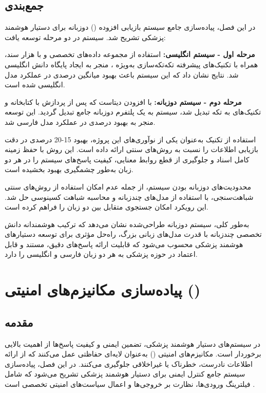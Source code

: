 \documentclass[11pt, a4paper, oneside]{book}
\begin{document}
	\section{جمع‌بندی}

	در این فصل، پیاده‌سازی جامع سیستم بازیابی افزوده () دوزبانه برای دستیار هوشمند پزشکی تشریح شد. سیستم در دو مرحله توسعه یافت:

	\textbf{مرحله اول - سیستم انگلیسی:}
	استفاده از مجموعه داده‌های تخصصی  و  با  هزار سند، همراه با تکنیک‌های پیشرفته تکه‌تکه‌سازی به‌ویژه ، منجر به ایجاد پایگاه دانش انگلیسی شد. نتایج نشان داد که این سیستم باعث بهبود میانگین  درصدی در عملکرد مدل انگلیسی شده است.

	\textbf{مرحله دوم - سیستم دوزبانه:}
	با افزودن دیتاست  که پس از پردازش با کتابخانه  و تکنیک‌های  به  تکه تبدیل شد، سیستم به یک پلتفرم دوزبانه جامع تبدیل گردید. این توسعه منجر به بهبود  درصدی در عملکرد مدل فارسی شد.

	استفاده از تکنیک  به‌عنوان یکی از نوآوری‌های این پروژه، بهبود 15-20 درصدی در دقت بازیابی اطلاعات را نسبت به روش‌های سنتی ارائه داده است. این روش با حفظ زمینه کامل اسناد و جلوگیری از قطع روابط معنایی، کیفیت پاسخ‌های سیستم را در هر دو زبان به‌طور چشمگیری بهبود بخشیده است.

	محدودیت‌های دوزبانه بودن سیستم، از جمله عدم امکان استفاده از روش‌های سنتی شباهت‌سنجی، با استفاده از مدل‌های  چندزبانه و محاسبه شباهت کسینوسی حل شد. این رویکرد امکان جستجوی متقابل بین دو زبان را فراهم کرده است.

	به‌طور کلی، سیستم  دوزبانه طراحی‌شده نشان می‌دهد که ترکیب هوشمندانه دانش تخصصی چندزبانه با قدرت مدل‌های زبانی بزرگ، راه‌حل مؤثری برای توسعه دستیارهای هوشمند پزشکی محسوب می‌شود که قابلیت ارائه پاسخ‌های دقیق، مستند و قابل اعتماد در حوزه پزشکی به هر دو زبان فارسی و انگلیسی را دارد.


	\chapter{پیاده‌سازی مکانیزم‌های امنیتی ()}
		
	\section{مقدمه}

	در سیستم‌های دستیار هوشمند پزشکی، تضمین ایمنی و کیفیت پاسخ‌ها از اهمیت بالایی برخوردار است. مکانیزم‌های امنیتی () به‌عنوان لایه‌ای حفاظتی عمل می‌کنند که از ارائه اطلاعات نادرست، خطرناک یا غیراخلاقی جلوگیری می‌کنند. در این فصل، پیاده‌سازی سیستم جامع کنترل ایمنی برای دستیار هوشمند پزشکی تشریح می‌شود که شامل فیلترینگ ورودی‌ها، نظارت بر خروجی‌ها و اعمال سیاست‌های امنیتی تخصصی است \cite{hallucinationguardrails2023openai}.
\end{document}
